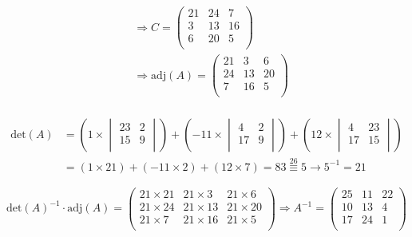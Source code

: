 \documentclass{article}
\newcommand{\modts}{\overset{26}{\equiv}}
\begin{document}
\begin{equation*}
\begin{split}
& \Rightarrow C = 
\begin{pmatrix}
21 & 24 & 7 \\
3 & 13 & 16 \\
6 & 20 & 5 \\
\end{pmatrix} \\
& \Rightarrow \mathrm{adj}(A) = 
\begin{pmatrix}
21 & 3 & 6 \\
24 & 13 & 20 \\
7 & 16 & 5 \\
\end{pmatrix} \\
\end{split}
\end{equation*}

\begin{equation*}
\begin{split}
\mathrm{det}(A) & = 
(1 \times 
\begin{vmatrix}
23 & 2 \\
15 & 9 \\
\end{vmatrix}
) + (
-11 \times 
\begin{vmatrix}
4 & 2 \\
17 & 9 \\
\end{vmatrix}
) + (
12 \times 
\begin{vmatrix}
4 & 23 \\
17 & 15 \\
\end{vmatrix}
) \\
& = (1 \times 21) + (-11 \times 2) + (12 \times 7) = 83 \modts 5 \rightarrow 5^{-1} = 21
\end{split}
\end{equation*}

\begin{equation*}
\mathrm{det}(A)^{-1} \cdot \mathrm{adj}(A) =
\begin{pmatrix}
21\times21 & 21\times3 & 21\times6 \\
21\times24 & 21\times13 & 21\times20 \\
21\times7 & 21\times16 & 21\times5 \\
\end{pmatrix} \Rightarrow 
A^{-1} = 
\begin{pmatrix}
25&11&22\\
10&13&4\\
17&24&1\\
\end{pmatrix}
\end{equation*}
\end{document}
